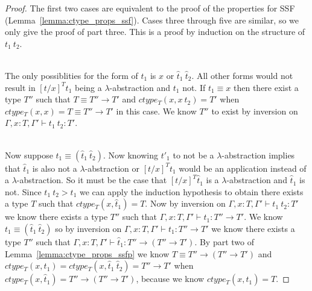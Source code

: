 \begin{proof}
  The first two cases are equivalent to the proof of the properties
  for SSF (Lemma~\ref{lemma:ctype_props_ssf}).  Cases three through five are similar, so we only give the
  proof of part three.  This is a proof by induction on the structure
  of $t_1\ t_2$.

  \ \\
  The only possiblities for the form of $t_1$ is $x$ or $\hat{t}_1\ \hat{t}_2$.  All other 
  forms would not result in $[t/x]^T t_1$ being a $\lambda$-abstraction and $t_1$ not.
  If $t_1 \equiv x$ then there exist a type $T''$ such that $T \equiv T'' \to T'$ and
  $ctype_T(x,x\ t_2) = T'$ when $ctype_T(x,x) = T \equiv T'' \to T'$ in this case.  We know
  $T''$ to exist by inversion on $\Gamma,x:T,\Gamma' \vdash t_1\ t_2:T'$.

  \ \\
  Now suppose $t_1 \equiv (\hat{t}_1\ \hat{t}_2)$.  Now knowing $t'_1$ to not be a $\lambda$-abstraction
  implies that $\hat{t}_1$ is also not a $\lambda$-abstraction or $[t/x]^T t_1$ would be an application
  instead of a $\lambda$-abstraction.  So it must be the case that $[t/x]^T \hat{t}_1$ is a $\lambda$-abstraction
  and $\hat{t}_1$ is not.  Since $t_1\ t_2 > t_1$ we can apply the induction hypothesis to obtain there exists
  a type $T$ such that $ctype_T(x,\hat{t}_1) = T$.  
  Now by inversion on $\Gamma,x:T,\Gamma' \vdash t_1\ t_2:T'$ we know there exists a type $T''$ such that
  $\Gamma,x:T,\Gamma' \vdash t_1:T'' \to T'$.  We know $t_1 \equiv (\hat{t}_1\ \hat{t}_2)$ so by inversion on
  $\Gamma,x:T,\Gamma' \vdash t_1:T'' \to T'$ we know there exists a type $T''$ such that
  $\Gamma,x:T,\Gamma' \vdash \hat{t}_1:T'' \to (T'' \to T')$.
  By part two of Lemma~\ref{lemma:ctype_props_ssfp} we know $T \equiv T'' \to (T'' \to T')$ and
  $ctype_T(x,t_1) = ctype_T(x,\hat{t}_1\ \hat{t}_2) = T'' \to T'$ 
  when $ctype_T(x,\hat{t}_1) = T'' \to (T'' \to T')$, because we know $ctype_T(x,\hat{t}_1) = T$.
\end{proof}

